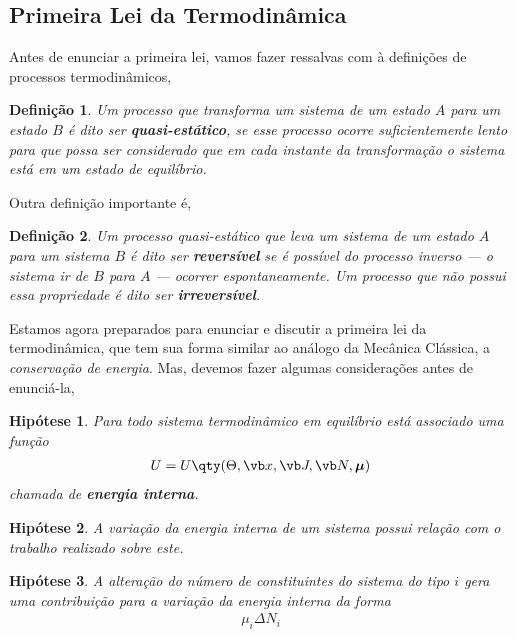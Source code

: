 \documentclass[twoside,reqno]{amsart}
\numberwithin{equation}{section}
\newtheorem{definicao}{Definição}[section]
\newtheorem{hipotese}{Hipótese}[section]
\begin{document}
\begin{refsection}
\subsection{Primeira Lei da Termodinâmica}

Antes de enunciar a primeira lei, vamos fazer ressalvas com à definições de processos 
termodinâmicos,

\begin{definicao}
    Um processo que transforma um sistema de um estado $A$ para um estado $B$ é dito ser 
    \textbf{quasi-estático}, se esse processo ocorre suficientemente lento para que possa 
    ser considerado que em cada instante da transformação o sistema está em um estado de 
    equilíbrio.
\end{definicao}

Outra definição importante é,

\begin{definicao}
    Um processo quasi-estático que leva um sistema de um estado $A$ para um sistema $B$ é 
    dito ser \textbf{reversível} se é possível do processo inverso --- o sistema ir de $B$ 
    para $A$ --- ocorrer espontaneamente. Um processo que não possui essa propriedade é dito 
    ser \textbf{irreversível}.
\end{definicao}

Estamos agora preparados para enunciar e discutir a primeira lei da termodinâmica, que tem sua forma similar ao análogo da Mecânica Clássica, a \emph{conservação de energia}. Mas, devemos fazer algumas considerações antes de enunciá-la,

\begin{hipotese}
    Para todo sistema termodinâmico em equilíbrio está associado uma função \begin{align}U=U\qty(\Theta,\vb x,\vb J,\vb N,\boldsymbol \mu)\end{align} chamada de \textbf{energia interna}.
\end{hipotese}

\begin{hipotese}
    A variação da energia interna de um sistema possui relação com o trabalho realizado sobre 
    este.
\end{hipotese}

\begin{hipotese}
    A alteração do número de constituintes do sistema do tipo $i$ gera uma contribuição para a 
    variação da energia interna da forma \begin{align}\mu_i\Delta N_i\end{align}
\end{hipotese}


\end{refsection}
\end{document}

